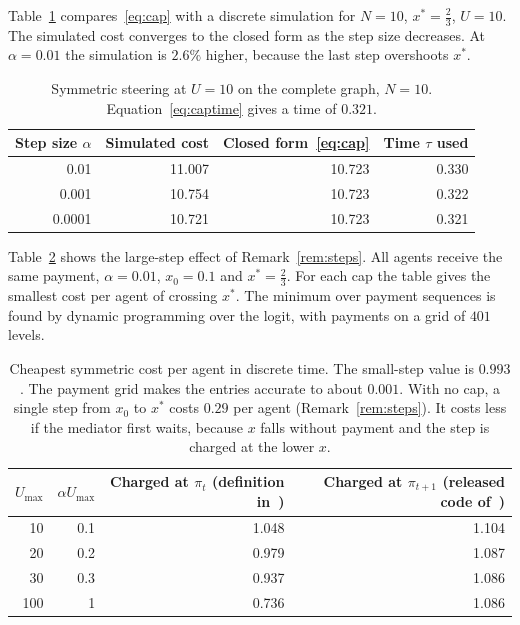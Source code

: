 \documentclass[11pt,a4paper]{article}
\theoremstyle{definition}
\theoremstyle{plain}
\newcommand{\xs}{x^{*}}
\begin{document}
Table~\ref{tab:cap} compares~\eqref{eq:cap} with a discrete simulation for $N=10$, $\xs=\tfrac23$, $U=10$. The simulated cost converges to the closed form as the step size decreases. At $\alpha=0.01$ the simulation is $2.6\%$ higher, because the last step overshoots $\xs$.

\begin{table}[H]
\centering\small
\begin{tabular}{rrrr}
\toprule
Step size $\alpha$ & Simulated cost & Closed form~\eqref{eq:cap} & Time $\tau$ used\\
\midrule
0.01 & 11.007 & 10.723 & 0.330\\
0.001 & 10.754 & 10.723 & 0.322\\
0.0001 & 10.721 & 10.723 & 0.321\\
\bottomrule
\end{tabular}
\caption{Symmetric steering at $U=10$ on the complete graph, $N=10$. Equation~\eqref{eq:captime} gives a time of $0.321$.}\label{tab:cap}
\end{table}

Table~\ref{tab:steps} shows the large-step effect of Remark~\ref{rem:steps}. All agents receive the same payment, $\alpha=0.01$, $x_0=0.1$ and $\xs=\tfrac23$. For each cap the table gives the smallest cost per agent of crossing $\xs$. The minimum over payment sequences is found by dynamic programming over the logit, with payments on a grid of $401$ levels.

\begin{table}[H]
\centering\small
\begin{tabular}{rrrr}
\toprule
$U_{\max}$ & $\alpha U_{\max}$ & Charged at $\pi_t$ (definition in~\cite{huang2025}) & Charged at $\pi_{t+1}$ (released code of~\cite{huang2025})\\
\midrule
10 & 0.1 & 1.048 & 1.104\\
20 & 0.2 & 0.979 & 1.087\\
30 & 0.3 & 0.937 & 1.086\\
100 & 1 & 0.736 & 1.086\\
\bottomrule
\end{tabular}
\caption{Cheapest symmetric cost per agent in discrete time. The small-step value is $0.993$. The payment grid makes the entries accurate to about $0.001$. With no cap, a single step from $x_0$ to $\xs$ costs $0.29$ per agent (Remark~\ref{rem:steps}). It costs less if the mediator first waits, because $x$ falls without payment and the step is charged at the lower $x$.}\label{tab:steps}
\end{table}
\end{document}
